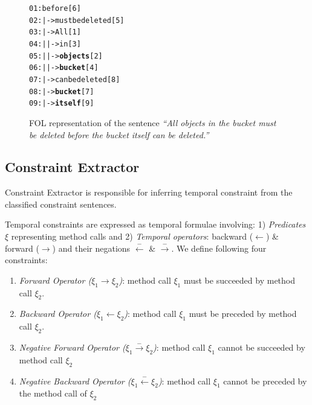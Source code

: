 \begin{figure}
	\begin{CodeOut}
		\begin{alltt}
			01:before[6]
			02:|->must be deleted[5]
			03:\hspace*{0.2in}|->All[1]
			04:\hspace*{0.2in}|\hspace*{0.2in}|->in[3]
			05:\hspace*{0.2in}|\hspace*{0.4in}|->\textbf{objects}[2]
			06:\hspace*{0.2in}|\hspace*{0.4in}|->\textbf{bucket}[4]
			07:\hspace*{0.2in}|->can be deleted[8]
			08:\hspace*{0.4in}|->\textbf{bucket}[7]
			09:\hspace*{0.4in}|->\textbf{itself}[9]
		\end{alltt}
	\end{CodeOut}
	\caption{\label{fig:FOLTree} FOL representation of the sentence \textit{``All objects in the bucket must be deleted before the bucket itself can be deleted.''}}
\end{figure}

\subsection{Constraint Extractor}
\label{sub:ConsExtract}

Constraint Extractor is responsible for inferring temporal constraint from the classified constraint sentences. 

Temporal constraints are expressed as temporal formulae involving: 1) \textit{Predicates} $\xi$ representing method calls and 2) \textit{Temporal operators}: backward ($\leftarrow$) \& forward ($\rightarrow$) and their negations $\xleftarrow{-}$ \& $\xrightarrow{-}$. We define following four constraints:

%
%
%

\begin{enumerate}
	\item \textit{Forward Operator ($\xi_1 \rightarrow \xi_2$)}: method call $\xi_1$ must be succeeded by method call $\xi_2$. 
	\item \textit{Backward Operator ($\xi_1 \leftarrow \xi_2$)}: method call $\xi_1$ must be preceded by method call $\xi_2$.
	\item \textit{Negative Forward Operator ($\xi_1 \xrightarrow{-} \xi_2$)}: method call $\xi_1$ cannot be succeeded by method call $\xi_2$
	\item \textit{Negative Backward Operator ($\xi_1 \xleftarrow{-} \xi_2$)}: method call $\xi_1$ cannot be preceded by the method call of $\xi_2$
\end{enumerate}

